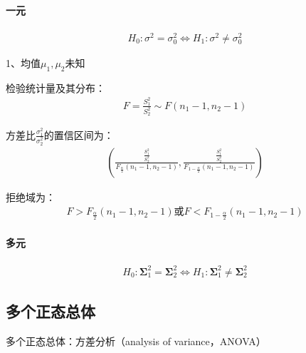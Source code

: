 \documentclass[12pt]{book}
\begin{document}
\paragraph{一元}

\begin{gather*}
    H_0:\sigma^2=\sigma_0^2\Leftrightarrow H_1:\sigma^2\neq\sigma_0^2
\end{gather*}


1、均值$\mu_1,\mu_2$未知

检验统计量及其分布：
\begin{gather*}
    F=\frac{S_1^2}{S_2^2}\sim F(n_1-1,n_2-1)
\end{gather*}


方差比$\frac{\sigma_1^2}{\sigma_2^2}$的置信区间为：
\begin{gather*}
    \left(
        \frac{\frac{S^2_1}{S_2^2}}{F_{\frac{\alpha}{2}}(n_1-1,n_2-1)},
        \frac{\frac{S^2_1}{S_2^2}}{F_{1-\frac{\alpha}{2}}(n_1-1,n_2-1)}
    \right)
\end{gather*}



拒绝域为：
\begin{gather*}
    F>F_{\frac{\alpha}{2}}(n_1-1,n_2-1)
    \text{或}
    F<F_{1-\frac{\alpha}{2}}(n_1-1,n_2-1)
\end{gather*}


\paragraph{多元}

\begin{gather*}
    H_0:\bm{\Sigma}_1^2=\bm{\Sigma}_2^2	\Leftrightarrow H_1:\bm{\Sigma}_1^2\neq\bm{\Sigma}_2^2
\end{gather*}



















\subsection{多个正态总体}






多个正态总体：方差分析（analysis of variance，ANOVA）
\end{document}
